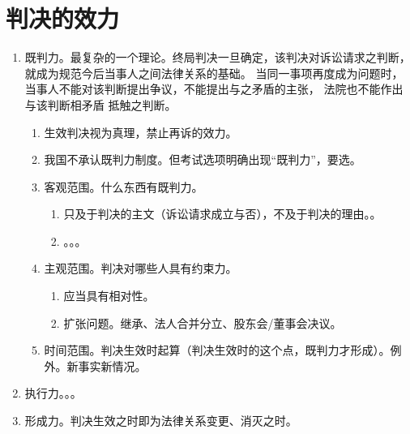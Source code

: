 \section{判决的效力}
\begin{enumerate}
  \item 既判力。最复杂的一个理论。终局判决一旦确定，该判决对诉讼请求之判断，就成为规范今后当事人之间法律关系的基础。
        当同一事项再度成为问题时，当事人不能对该判断提出争议，不能提出与之矛盾的主张，
        法院也不能作出与该判断相矛盾 \hz 抵触之判断。
        \begin{enumerate}
          \item 生效判决视为真理，禁止再诉的效力。
          \item 我国不承认既判力制度。但考试选项明确出现“既判力”，要选。
          \item 客观范围。什么东西有既判力。
                \begin{enumerate}
                  \item 只及于判决的主文（诉讼请求成立与否），不及于判决的理由。。
                  \item {}。。。
                \end{enumerate}
          \item 主观范围。判决对哪些人具有约束力。
                \begin{enumerate}
                  \item 应当具有相对性。
                  \item 扩张问题。继承、法人合并分立、股东会/董事会决议。
                \end{enumerate}
          \item 时间范围。判决生效时起算（判决生效时的这个点，既判力才形成）。例外。新事实新情况。
        \end{enumerate}
  \item 执行力。。。
  \item 形成力。判决生效之时即为法律关系变更、消灭之时。
\end{enumerate}

